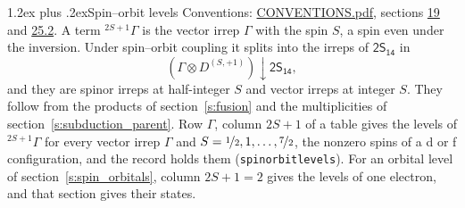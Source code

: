 \documentclass[10pt,a4paper]{article}
\makeatletter
\renewcommand\section{\@startsection{section}{1}{\z@}{-3ex plus -1ex minus -.2ex}%
  {1.2ex plus .2ex}{\normalfont\large\sffamily\bfseries\color{parttitle}}}
\numberwithin{equation}{section}
\newcommand{\grp}[1]{\mathsf{#1}}
\newcommand{\restr}[2]{#1\!\downarrow#2}
\newcommand{\irrJp}[2]{D^{(#1,#2)}}
\newcommand{\irrprod}{\otimes}
\newcommand{\term}[2]{{}^{#1}#2}
\makeatother
\begin{document}
\section{Spin--orbit levels}\label{s:spin_orbit}
Conventions: \href{../../CONVENTIONS.pdf}{CONVENTIONS.pdf}, sections \href{../../../rotation/CONVENTIONS.pdf\#conv.19}{19} and \href{../../CONVENTIONS.pdf\#conv.25.2}{25.2}.
\leavevmode\label{n:local.spin}\label{n:symbol.term}A term $\term{2S+1}{\Gamma}$ is the vector irrep $\Gamma$ with the spin $S$, a spin even under the inversion. Under spin--orbit coupling it splits into the irreps of $\grp{2S_{14}}$ in
\begin{equation}\label{e:spinorbit}\restr{(\Gamma \irrprod \irrJp{S}{+1})}{\grp{2S_{14}}},\end{equation}
and they are spinor irreps at half-integer $S$ and vector irreps at integer $S$. They follow from the products of section~\ref{s:fusion} and the multiplicities of section~\ref{s:subduction_parent}. Row $\Gamma$, column $2S + 1$ of a table gives the levels of $\term{2S+1}{\Gamma}$ for every vector irrep $\Gamma$ and $S = \nicefrac{1}{2}, 1, \dots, \nicefrac{7}{2}$, the nonzero spins of a d or f configuration, and the record holds them (\texttt{spinorbitlevels}). For an orbital level of section~\ref{s:spin_orbitals}, column $2S + 1 = 2$ gives the levels of one electron, and that section gives their states.
\end{document}
